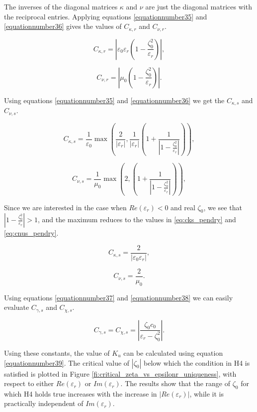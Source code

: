 The inverses of the diagonal matrices $\kappa$ and $\nu$ are just the 
diagonal matrices with the reciprocal entries.
Applying equations \eqref{equationnumber35} and \eqref{equationnumber36} gives the values of $C_{\kappa,r}$ and $C_{\nu,r}$.

\begin{equation}
C_{\kappa,r} =  |\varepsilon_0\varepsilon_r (1 - \frac{\zeta_0^2}{\varepsilon_r})|,
\end{equation}

\begin{equation}
C_{\nu,r} =  |\mu_0 (1 - \frac{\zeta_0^2}{\varepsilon_r})|. 
\end{equation}

Using equations \eqref{equationnumber35} and \eqref{equationnumber36} we get the $C_{\kappa,s}$ and $C_{\nu,s}$.

\begin{equation}
C_{\kappa,s} =  \frac{1}{\varepsilon_0} \max(\frac{2}{|\varepsilon_r|}, \frac{1}{|\varepsilon_r|}(1 + \frac{1}{|1 - \frac{\zeta_0^2}{\varepsilon_r}|})),
\end{equation}

\begin{equation}
C_{\nu,s} = \frac{1}{\mu_0} \max(2, (1 + \frac{1}{|1 - \frac{\zeta_0^2}{\varepsilon_r}|})),
\end{equation}

Since we are interested in the case when $Re(\varepsilon_r) < 0$ and real $\zeta_0$, 
 we see that $|1 - \frac{\zeta_0^2}{\varepsilon_r}| > 1$,   and the maximum reduces to 
the values in \eqref{eq:cks_pendry} and \eqref{eq:cnus_pendry}.

\begin{equation} \label{eq:cks_pendry}
C_{\kappa,s} =  \frac{2}{|\varepsilon_0\varepsilon_r|},
\end{equation}

\begin{equation} \label{eq:cnus_pendry}
C_{\nu,s} = \frac{2}{\mu_0}. 
\end{equation}

Using equations \eqref{equationnumber37} and \eqref{equationnumber38} 
we can easily evaluate $C_{\gamma,s}$ and $C_{\chi,s}$. 

\begin{equation}
C_{\gamma,s} =  C_{\chi,s} = |\frac{\zeta_0c_0}{\varepsilon_r - \zeta_0^2}|. 
\end{equation}

Using these constants, the value of $K_u$  can be calculated using equation \eqref{equationnumber39}.
The critical value of $|\zeta_0|$ below which the condition in H4 is satisfied is plotted in Figure \ref{fi:critical_zeta_vs_epsilonr_uniqueness}, 
with respect to either $Re(\varepsilon_r)$ or $Im(\varepsilon_r)$.
The results show that the range of $\zeta_0$ for which H4 holds true increases with the increase in $|Re(\varepsilon_r)|$, 
while it is practically independent of $Im(\varepsilon_r)$.

